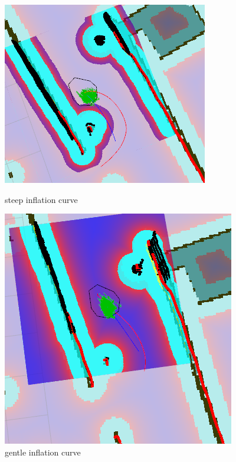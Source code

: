 \documentclass[12pt]{article}
\begin{document}
\begin{figure}[!htb]
  \includegraphics[width=\linewidth]{notgoodinflation.png}
  \caption{steep inflation curve}
\endminipage\hfill
{}
  \includegraphics[width=\linewidth]{goodinflation.png}
  \caption{gentle inflation curve}
\endminipage\hfill
\end{figure}
\end{document}
